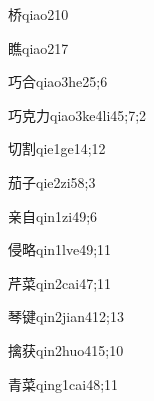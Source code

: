 \begin{verbete}{桥}{qiao2}{10}
\end{verbete}

\begin{verbete}{瞧}{qiao2}{17}
\end{verbete}

\begin{verbete}{巧合}{qiao3he2}{5;6}
\end{verbete}

\begin{verbete}{巧克力}{qiao3ke4li4}{5;7;2}
\end{verbete}

\begin{verbete}{切割}{qie1ge1}{4;12}
\end{verbete}

\begin{verbete}{茄子}{qie2zi5}{8;3}
\end{verbete}

\begin{verbete}{亲自}{qin1zi4}{9;6}
\end{verbete}

\begin{verbete}{侵略}{qin1lve4}{9;11}
\end{verbete}

\begin{verbete}{芹菜}{qin2cai4}{7;11}
\end{verbete}

\begin{verbete}{琴键}{qin2jian4}{12;13}
\end{verbete}

\begin{verbete}{擒获}{qin2huo4}{15;10}
\end{verbete}

\begin{verbete}{青菜}{qing1cai4}{8;11}
\end{verbete}

